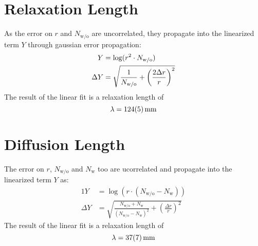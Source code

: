 
\section{Relaxation Length}
As the error on $r$ and $N_\text{w/o}$ are uncorrelated, they propagate into the linearized term $Y$ through gaussian error propagation:
\begin{alignat}{1}
	Y &= \log(r^2 \cdot N_\text{w/o}) \nonumber\\
	\Delta Y &= \sqrt{
		\frac{1}{N_\text{w/o}} +
		\left(\frac{2 \Delta r}{r}\right)^2
	}
\end{alignat}
The result of the linear fit is a relaxation length of
\begin{equation*}
	\lambda = \SI{124 +- 5}{\mm}
\end{equation*}

\section{Diffusion Length}
The error on $r$, $N_\text{w/o}$ and $N_\text{w}$ too are ucorrelated and propagate into the linearized term $Y$ as:
\begin{alignat}{1}
	Y &= \log(r \cdot (N_\text{w/o} - N_\text{w})) \nonumber\\
	\Delta Y &= \sqrt{
		\frac{N_\text{w/o} + N_\text{w}}{(N_\text{w/o} - N_\text{w})^2} +
		\left(\frac{\Delta r}{r}\right)^2
	}
\end{alignat}
The result of the linear fit is a relaxation length of
\begin{equation*}
	\lambda = \SI{37 +- 7}{\mm}
\end{equation*}
